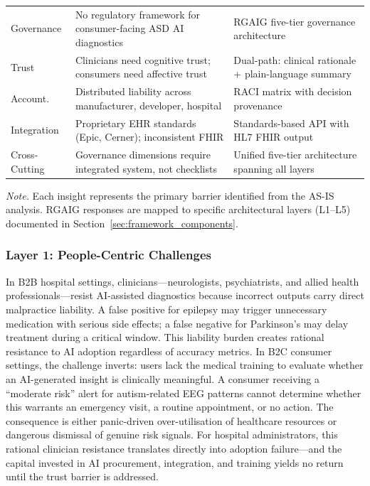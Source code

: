 {\begin{xltabular}{\textwidth}{@{} >{\raggedright\arraybackslash}p{2.2cm} L L @{}}
\addlinespace
Governance & No regulatory framework for consumer-facing ASD AI diagnostics & RGAIG five-tier governance architecture \\
\addlinespace
Trust & Clinicians need cognitive trust; consumers need affective trust & Dual-path: clinical rationale + plain-language summary \\
\addlinespace
Account. & Distributed liability across manufacturer, developer, hospital & RACI matrix with decision provenance \\
\addlinespace
Integration & Proprietary EHR standards (Epic, Cerner); inconsistent FHIR & Standards-based API with HL7 FHIR output \\
\addlinespace
Cross-Cutting & Governance dimensions require integrated system, not checklists & Unified five-tier architecture spanning all layers \\
\end{xltabular}}
\vspace{0.5em}
\noindent\textit{Note.} Each insight represents the primary barrier identified from the AS-IS analysis. RGAIG responses are mapped to specific architectural layers (L1--L5) documented in Section~\ref{sec:framework_components}.

\iffalse %
\subsubsection{Layer 1: People-Centric Challenges}

In B2B hospital settings, clinicians---neurologists, psychiatrists, and allied health professionals---resist AI-assisted diagnostics because incorrect outputs carry direct malpractice liability. A false positive for epilepsy may trigger unnecessary medication with serious side effects; a false negative for Parkinson's may delay treatment during a critical window. This liability burden creates rational resistance to AI adoption regardless of accuracy metrics. In B2C consumer settings, the challenge inverts: users lack the medical training to evaluate whether an AI-generated insight is clinically meaningful. A consumer receiving a ``moderate risk'' alert for autism-related EEG patterns cannot determine whether this warrants an emergency visit, a routine appointment, or no action. The consequence is either panic-driven over-utilisation of healthcare resources or dangerous dismissal of genuine risk signals. For hospital administrators, this rational clinician resistance translates directly into adoption failure---and the capital invested in AI procurement, integration, and training yields no return until the trust barrier is addressed.

